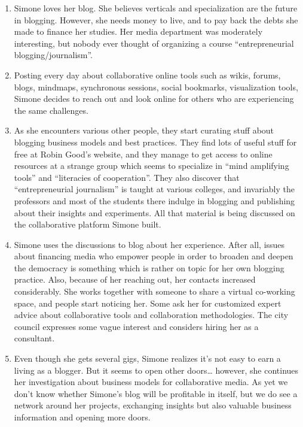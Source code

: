 \begin{enumerate}
\item
  Simone loves her blog. She believes verticals and specialization are
  the future in blogging. However, she needs money to live, and to pay
  back the debts she made to finance her studies. Her media department
  was moderately interesting, but nobody ever thought of organizing a
  course ``entrepreneurial blogging/journalism''.
\item
  Posting every day about collaborative online tools such as wikis,
  forums, blogs, mindmaps, synchronous sessions, social bookmarks,
  visualization tools, Simone decides to reach out and look online for
  others who are experiencing the same challenges.
\item
  As she encounters various other people, they start curating stuff
  about blogging business models and best practices. They find lots of
  useful stuff for free at Robin Good's website, and they manage to get
  access to online resources at a strange group which seems to
  specialize in ``mind amplifying tools'' and ``literacies of
  cooperation''. They also discover that ``entrepreneurial journalism''
  is taught at various colleges, and invariably the professors and most
  of the students there indulge in blogging and publishing about their
  insights and experiments. All that material is being discussed on the
  collaborative platform Simone built.
\item
  Simone uses the discussions to blog about her experience. After all,
  issues about financing media who empower people in order to broaden
  and deepen the democracy is something which is rather on topic for her
  own blogging practice. Also, because of her reaching out, her contacts
  increased considerably. She works together with someone to share a
  virtual co-working space, and people start noticing her. Some ask her
  for customized expert advice about collaborative tools and
  collaboration methodologies. The city council expresses some vague
  interest and considers hiring her as a consultant.
\item
  Even though she gets several gigs, Simone realizes it's not easy to
  earn a living as a blogger. But it seems to open other doors\ldots{}
  however, she continues her investigation about business models for
  collaborative media. As yet we don't know whether Simone's blog will
  be profitable in itself, but we do see a network around her projects,
  exchanging insights but also valuable business information and opening
  more doors.
\end{enumerate}
